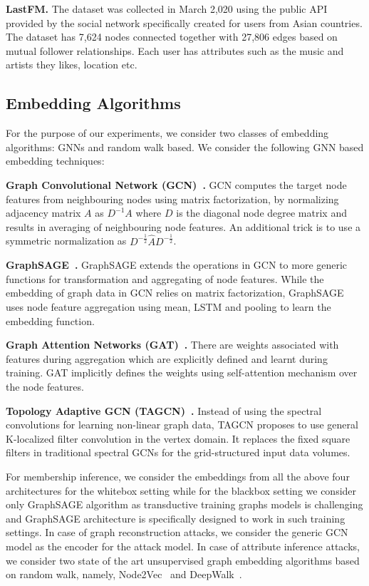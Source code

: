 \noindent\textbf{LastFM.} The dataset was collected in March 2,020 using the public API provided by the social network specifically created for users from Asian countries.
The dataset has 7,624 nodes connected together with 27,806 edges based on mutual follower relationships.
Each user has attributes such as the music and artists they likes, location etc.


\subsection{Embedding Algorithms}


\noindent For the purpose of our experiments, we consider two classes of embedding algorithms: GNNs and random walk based.
We consider the following GNN based embedding techniques:

\noindent\textbf{Graph Convolutional Network (GCN)~\cite{Kipf2016tc}.} GCN computes the target node features from neighbouring nodes using matrix factorization, by normalizing adjacency matrix $A$ as $D^{-1}A$ where $D$ is the diagonal node degree matrix and results in averaging of neighbouring node features.
An additional trick is to use a symmetric normalization as $D^{-\frac{1}{2}}\hat{A}D^{-\frac{1}{2}}$.

\noindent\textbf{GraphSAGE~\cite{NIPS20176703}.} GraphSAGE extends the operations in GCN to more generic functions for transformation and aggregating of node features.
While the embedding of graph data in GCN relies on matrix factorization, GraphSAGE uses node feature aggregation using mean, LSTM and pooling to learn the embedding function.

\noindent\textbf{Graph Attention Networks (GAT)~\cite{velickovic2018graph}.} There are weights associated with features during aggregation which are explicitly defined and learnt during training.
GAT implicitly defines the weights using self-attention mechanism over the node features.

\noindent\textbf{Topology Adaptive GCN (TAGCN)~\cite{du2018topology}.} Instead of using the spectral convolutions for learning non-linear graph data, TAGCN proposes to use general K-localized filter convolution in the vertex domain.
It replaces the fixed square filters in traditional spectral GCNs for the grid-structured input data volumes.



\noindent For membership inference, we consider the embeddings from all the above four architectures for the whitebox setting while for the blackbox setting we consider only GraphSAGE algorithm as transductive training graphs models is challenging and GraphSAGE architecture is specifically designed to work in such training settings.
In case of graph reconstruction attacks, we consider the generic GCN model as the encoder for the attack model.
In case of attribute inference attacks, we consider two state of the art unsupervised graph embedding algorithms based on random walk, namely, Node2Vec~\cite{node2vec} and DeepWalk~\cite{deepwalk}.

